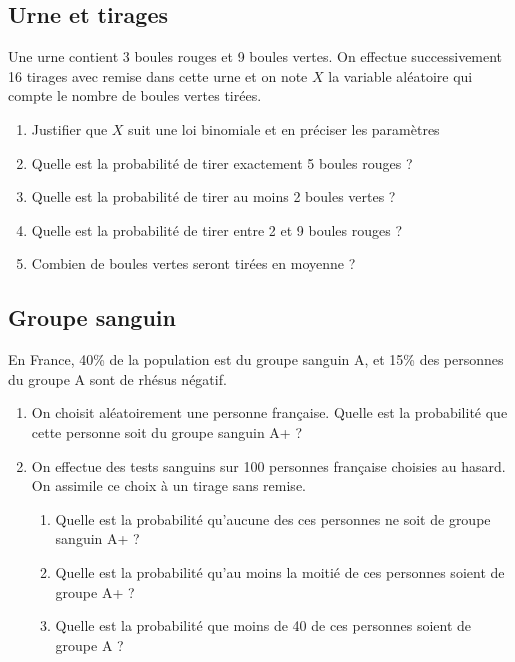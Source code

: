 \documentclass[oneside,12pt]{book}          %
\begin{document}
\subsection{Urne et tirages}
Une urne contient 3 boules rouges et 9 boules vertes. On effectue successivement 16 tirages avec remise dans cette urne et on note $X$ la variable aléatoire qui compte le nombre de boules vertes tirées.
\begin{enumerate}
    \item Justifier que $X$ suit une loi binomiale et en préciser les paramètres
    \item Quelle est la probabilité de tirer exactement 5 boules rouges ?
    \item Quelle est la probabilité de tirer au moins 2 boules vertes ?
    \item Quelle est la probabilité de tirer entre 2 et 9 boules rouges ?
    \item Combien de boules vertes seront tirées en moyenne ?
\end{enumerate}



\subsection{Groupe sanguin}
En France, 40\% de la population est du groupe sanguin A, et 15\% des personnes du groupe A sont de rhésus négatif.
\begin{enumerate}
    \item On choisit aléatoirement une personne française. Quelle est la probabilité que cette personne soit du groupe sanguin A+ ?
    \item On effectue des tests sanguins sur 100 personnes française choisies au hasard. On assimile ce choix à  un tirage sans remise.
    \begin{enumerate}
        \item Quelle est la probabilité qu'aucune des ces personnes ne soit de groupe sanguin A+ ?
        \item Quelle est la probabilité qu'au moins la moitié de ces personnes soient de groupe A+ ?
        \item Quelle est la probabilité que moins de 40 de ces personnes soient de groupe A ?
    \end{enumerate}
\end{enumerate}
\end{document}
